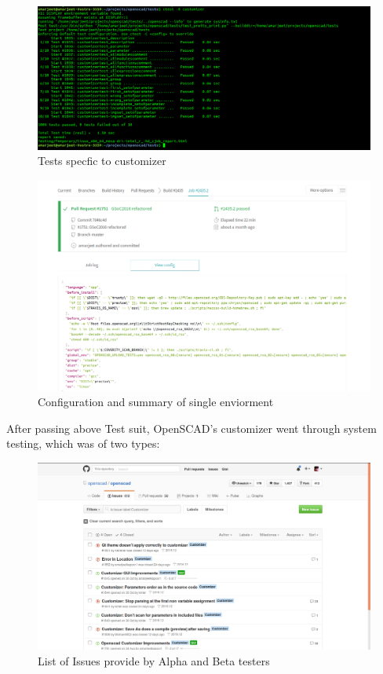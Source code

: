 \begin{enumerate}
 	\begin{figure}
 		\centering
 		\includegraphics[width=0.8\linewidth]{images/ctest}
 		\caption{Tests specfic to customizer}
 		\label{fig:ctest}
 	\end{figure}
 	
 \end{enumerate}

\begin{figure}
	\centering
	\includegraphics[width=0.9\linewidth]{images/travisSpecific}
	\caption{Configuration and summary of single enviorment}
	\label{fig:travisSpecific}
\end{figure}
 
After passing above Test suit, OpenSCAD's customizer went through system testing, which was of two types:
\begin{figure}
\centering
\includegraphics[width=0.8\linewidth]{images/Issues}
\caption{List of Issues provide by Alpha and Beta testers}
\label{fig:Issues}
\end{figure}

